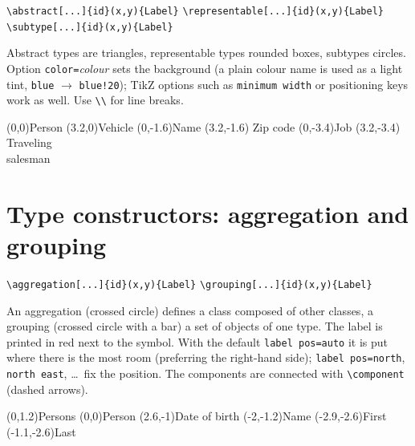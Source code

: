\documentclass[10pt,a4paper]{article}
\newcommand\cs[1]{\texttt{\textbackslash#1}}
\newcommand\meta[1]{\textlangle\textit{#1}\textrangle}
\begin{document}
\begin{center}
\verb|\abstract[...]{id}(x,y){Label}|\qquad
\verb|\representable[...]{id}(x,y){Label}|\qquad
\verb|\subtype[...]{id}(x,y){Label}|
\end{center}

Abstract types are triangles, representable types rounded boxes,
subtypes circles. Option \texttt{color=}\meta{colour} sets the
background (a plain colour name is used as a light tint, \texttt{blue}
$\to$ \texttt{blue!20}); TikZ options such as \texttt{minimum width} or
positioning keys work as well. Use \verb|\\| for line breaks.

\begin{example}
\begin{gsmdiagram}
  (0,0){Person}
  (3.2,0){Vehicle}
  (0,-1.6){Name}
  (3.2,-1.6)
    {Zip code}
  (0,-3.4){Job}
  (3.2,-3.4)
    {Traveling\\salesman}
\end{gsmdiagram}
\end{example}

\section{Type constructors: aggregation and grouping}

\begin{center}
\verb|\aggregation[...]{id}(x,y){Label}|\qquad
\verb|\grouping[...]{id}(x,y){Label}|
\end{center}

An aggregation (crossed circle) defines a class composed of other
classes, a grouping (crossed circle with a bar) a set of objects of one
type. The label is printed in red next to the symbol. With the default
\texttt{label pos=auto} it is put where there is the most room
(preferring the right-hand side); \texttt{label pos=north},
\texttt{north east}, \dots\ fix the position. The components are
connected with \cs{component} (dashed arrows).

\begin{example}
\begin{gsmdiagram}
  (0,1.2){Persons}
  (0,0){Person}
  (2.6,-1){Date of birth}
  (-2,-1.2){Name}
  (-2.9,-2.6){First}
  (-1.1,-2.6){Last}
\end{gsmdiagram}
\end{example}
\end{document}
